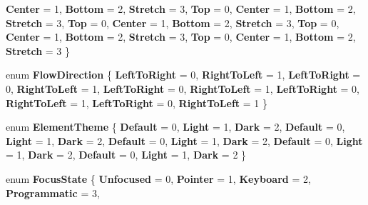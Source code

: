 \begin{DoxyCompactItemize}
{\bfseries Center} = 1, 
{\bfseries Bottom} = 2, 
{\bfseries Stretch} = 3, 
\newline
{\bfseries Top} = 0, 
{\bfseries Center} = 1, 
{\bfseries Bottom} = 2, 
{\bfseries Stretch} = 3, 
\newline
{\bfseries Top} = 0, 
{\bfseries Center} = 1, 
{\bfseries Bottom} = 2, 
{\bfseries Stretch} = 3, 
\newline
{\bfseries Top} = 0, 
{\bfseries Center} = 1, 
{\bfseries Bottom} = 2, 
{\bfseries Stretch} = 3, 
\newline
{\bfseries Top} = 0, 
{\bfseries Center} = 1, 
{\bfseries Bottom} = 2, 
{\bfseries Stretch} = 3
 \}
\item 
\mbox{\label{namespace_windows_1_1_u_i_1_1_xaml_a05520a61af727955c4e50fc1f58fb7db}} 
enum {\bfseries Flow\+Direction} \{ \newline
{\bfseries Left\+To\+Right} = 0, 
{\bfseries Right\+To\+Left} = 1, 
{\bfseries Left\+To\+Right} = 0, 
{\bfseries Right\+To\+Left} = 1, 
\newline
{\bfseries Left\+To\+Right} = 0, 
{\bfseries Right\+To\+Left} = 1, 
{\bfseries Left\+To\+Right} = 0, 
{\bfseries Right\+To\+Left} = 1, 
\newline
{\bfseries Left\+To\+Right} = 0, 
{\bfseries Right\+To\+Left} = 1
 \}
\item 
\mbox{\label{namespace_windows_1_1_u_i_1_1_xaml_a7e1a4f3aaa641c44365e5b007c4d84ce}} 
enum {\bfseries Element\+Theme} \{ \newline
{\bfseries Default} = 0, 
{\bfseries Light} = 1, 
{\bfseries Dark} = 2, 
{\bfseries Default} = 0, 
\newline
{\bfseries Light} = 1, 
{\bfseries Dark} = 2, 
{\bfseries Default} = 0, 
{\bfseries Light} = 1, 
\newline
{\bfseries Dark} = 2, 
{\bfseries Default} = 0, 
{\bfseries Light} = 1, 
{\bfseries Dark} = 2, 
\newline
{\bfseries Default} = 0, 
{\bfseries Light} = 1, 
{\bfseries Dark} = 2
 \}
\item 
\mbox{\label{namespace_windows_1_1_u_i_1_1_xaml_a1ea241d4a0cb7c10af82c7b36d2806bc}} 
enum {\bfseries Focus\+State} \{ \newline
{\bfseries Unfocused} = 0, 
{\bfseries Pointer} = 1, 
{\bfseries Keyboard} = 2, 
{\bfseries Programmatic} = 3, 

\end{DoxyCompactItemize}
